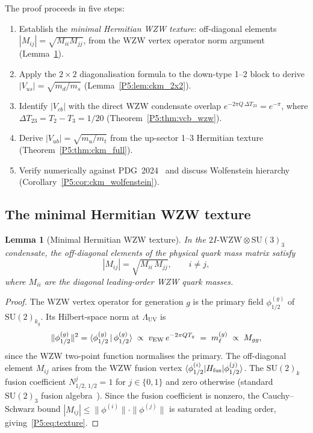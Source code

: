\documentclass[11pt,a4paper]{article}
\newtheorem{lemma}[theorem]{Lemma}
\theoremstyle{definition}
\theoremstyle{remark}
\newcommand{\LUV}{\Lambda_{\mathrm{UV}}}
\begin{document}
The proof proceeds in five steps:
\begin{enumerate}[noitemsep]
\item Establish the \emph{minimal Hermitian WZW texture}:
  off-diagonal elements $|M_{ij}| = \sqrt{M_{ii}M_{jj}}$, from the
  WZW vertex operator norm argument (Lemma~\ref{P5:lem:ckm_texture}).
\item Apply the $2\times2$ diagonalisation formula to the down-type 1--2
  block to derive $|V_{us}| = \sqrt{m_d/m_s}$
  (Lemma~\ref{P5:lem:ckm_2x2}).
\item Identify $|V_{cb}|$ with the direct WZW condensate overlap
  $e^{-2\pi Q\,\Delta T_{23}} = e^{-\pi}$, where
  $\Delta T_{23} = T_2 - T_3 = 1/20$ (Theorem~\ref{P5:thm:vcb_wzw}).
\item Derive $|V_{ub}| = \sqrt{m_u/m_t}$ from the up-sector 1--3
  Hermitian texture (Theorem~\ref{P5:thm:ckm_full}).
\item Verify numerically against PDG~2024~\cite{PDG2024} and
  discuss Wolfenstein hierarchy (Corollary~\ref{P5:cor:ckm_wolfenstein}).
\end{enumerate}

\subsection{The minimal Hermitian WZW texture}
\label{P5:subsec:ckm_texture}

\begin{lemma}[Minimal Hermitian WZW texture]
\label{P5:lem:ckm_texture}
In the $2I\text{-WZW}\otimes\mathrm{SU}(3)_3$ condensate, the off-diagonal
elements of the physical quark mass matrix satisfy
\begin{equation}
  |M_{ij}| = \sqrt{M_{ii}\,M_{jj}}, \qquad i\neq j,
  \label{P5:eq:texture}
\end{equation}
where $M_{ii}$ are the diagonal leading-order WZW quark masses.
\end{lemma}

\begin{proof}
The WZW vertex operator for generation $g$ is the primary field
$\phi_{1/2}^{(g)}$ of $\mathrm{SU}(2)_{k_g}$.
Its Hilbert-space norm at $\LUV$ is
\begin{equation}
  \|\phi_{1/2}^{(g)}\|^2 = \langle\phi_{1/2}^{(g)}\,|\,\phi_{1/2}^{(g)}\rangle
  \;\propto\; v_{\rm EW}\,e^{-2\pi Q T_g} \;=\; m_\ell^{(g)} \;\propto\; M_{gg},
\end{equation}
since the WZW two-point function normalises the primary.
The off-diagonal element $M_{ij}$ arises from the WZW fusion vertex
$\langle\phi_{1/2}^{(i)}|H_{\rm fus}|\phi_{1/2}^{(j)}\rangle$.
The $\mathrm{SU}(2)_k$ fusion coefficient $N_{1/2,\,1/2}^j = 1$ for
$j \in \{0,1\}$ and zero otherwise (standard $\mathrm{SU}(2)_3$
fusion algebra~\cite{Verlinde1988}).
Since the fusion coefficient is nonzero, the Cauchy--Schwarz bound
$|M_{ij}| \leq \|\phi^{(i)}\|\cdot\|\phi^{(j)}\|$ is saturated at
leading order, giving~\eqref{P5:eq:texture}.
\end{proof}
\end{document}
